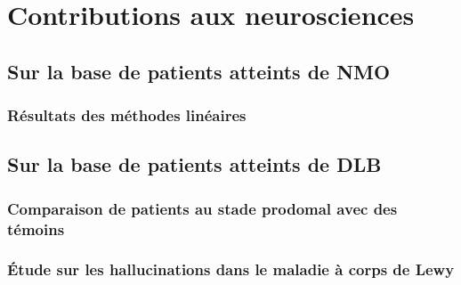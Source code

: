 
\chapter{Contributions aux neurosciences}
\label{Chapter11}





\section{Sur la base de patients atteints de NMO}

\subsection{Résultats des méthodes linéaires}




\section{Sur la base de patients atteints de DLB}
\subsection{Comparaison de patients au stade prodomal avec des témoins}
\subsection{Étude sur les hallucinations dans le maladie à corps de Lewy}


